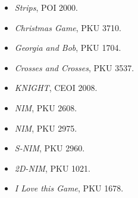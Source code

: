 \documentclass[11pt]{article}
\begin{document}
\begin{itemize}
  \item \textit{Strips}, POI 2000.
  \item \textit{Christmas Game}, PKU 3710.
  \item \textit{Georgia and Bob}, PKU 1704.
  \item \textit{Crosses and Crosses}, PKU 3537.
  \item \textit{KNIGHT}, CEOI 2008.
  \item \textit{NIM}, PKU 2608.
  \item \textit{NIM}, PKU 2975.
  \item \textit{S-NIM}, PKU 2960.
  \item \textit{2D-NIM}, PKU 1021.
  \item \textit{I Love this Game}, PKU 1678.
\end{itemize}
\end{document}
